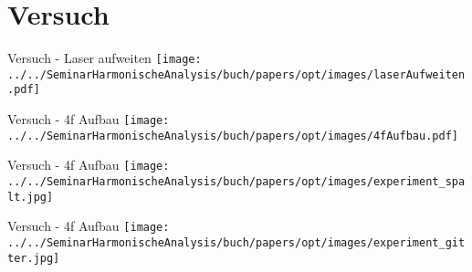 \section{Versuch}

\begin{frame}{Versuch - Laser aufweiten}
    \centering
    \texttt{[image: ../../SeminarHarmonischeAnalysis/buch/papers/opt/images/laserAufweiten.pdf]}
\end{frame}

\begin{frame}{Versuch - 4f Aufbau}
    \texttt{[image: ../../SeminarHarmonischeAnalysis/buch/papers/opt/images/4fAufbau.pdf]}
\end{frame}

\begin{frame}{Versuch - 4f Aufbau}
    \centering
    \texttt{[image: ../../SeminarHarmonischeAnalysis/buch/papers/opt/images/experiment\_spalt.jpg]}
\end{frame}

\begin{frame}{Versuch - 4f Aufbau}
    \centering
    \texttt{[image: ../../SeminarHarmonischeAnalysis/buch/papers/opt/images/experiment\_gitter.jpg]}
\end{frame}
